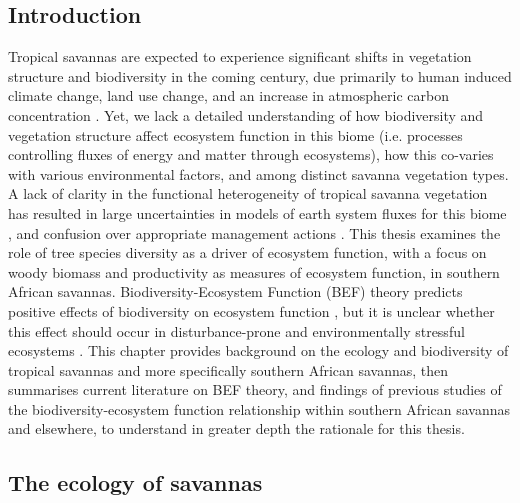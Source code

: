 \begin{refsection}


\chapter[\chaptertitle]{\chaptertitle}
\label{ch:background}

\clearpage{}
\section{Introduction}
\label{background:sec:intro}

Tropical savannas are expected to experience significant shifts in vegetation structure and biodiversity in the coming century, due primarily to human induced climate change, land use change, and an increase in atmospheric carbon concentration \citep{Ross2021, Scheiter2009, Moncrieff2016}. Yet, we lack a detailed understanding of how biodiversity and vegetation structure affect ecosystem function in this biome (i.e. processes controlling fluxes of energy and matter through ecosystems), how this co-varies with various environmental factors, and among distinct savanna vegetation types. A lack of clarity in the functional heterogeneity of tropical savanna vegetation has resulted in large uncertainties in models of earth system fluxes for this biome \citep{Ahlstrom2015}, and confusion over appropriate management actions \citep{Veldman2015}. This thesis examines the role of tree species diversity as a driver of ecosystem function, with a focus on woody biomass and productivity as measures of ecosystem function, in southern African savannas. Biodiversity-Ecosystem Function (BEF) theory predicts positive effects of biodiversity on ecosystem function \citep{Tilman2014}, but it is unclear whether this effect should occur in disturbance-prone and environmentally stressful ecosystems \citep{Steudel2012, Baert2018}. This chapter provides background on the ecology and biodiversity of tropical savannas and more specifically southern African savannas, then summarises current literature on BEF theory, and findings of previous studies of the biodiversity-ecosystem function relationship within southern African savannas and elsewhere, to understand in greater depth the rationale for this thesis.

\section{The ecology of savannas}
\label{background:sec:savanna}


\end{refsection}
